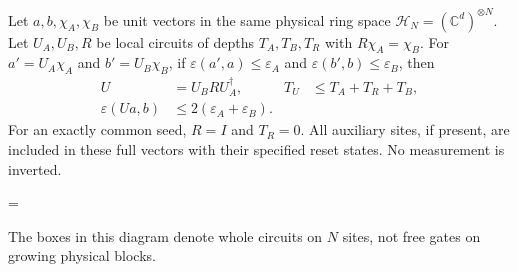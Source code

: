 \begin{lemma}
    \label{thm:ldp_compatible_seed_conversion}
    \leanok
    Let $a,b,\chi_A,\chi_B$ be unit vectors in the same physical ring
    space $\mathcal H_N=(\mathbb C^d)^{\otimes N}$. Let $U_A,U_B,R$ be
    local circuits of depths $T_A,T_B,T_R$ with $R\chi_A=\chi_B$.
    For $a'=U_A\chi_A$ and $b'=U_B\chi_B$, if
    $\varepsilon(a',a)\leq\varepsilon_A$ and
    $\varepsilon(b',b)\leq\varepsilon_B$, then
    \begin{align}
        U                 & =U_BRU_A^\dagger,                   & T_U & \leq T_A+T_R+T_B,
        \label{eq:ldp_seed_composition}                                                   \\
        \varepsilon(Ua,b) & \leq2(\varepsilon_A+\varepsilon_B).
        \label{eq:ldp_seed_error}
    \end{align}
    For an exactly common seed, $R=I$ and $T_R=0$.
    All auxiliary sites, if present, are included in these full vectors
    with their specified reset states. No measurement is inverted.

    \begin{center}
        \tenkzkernel
        \begin{tenkzequation}
            \begin{tenkz}[rows={wire}, cols=1, bonds=none]
            \end{tenkz}
            =
            \begin{tenkz}[rows={wire,wire,wire}, cols=1, bonds=none]
            \end{tenkz}
        \end{tenkzequation}
    \end{center}
    The boxes in this diagram denote whole circuits on $N$ sites, not
    free gates on growing physical blocks.
\end{lemma}
